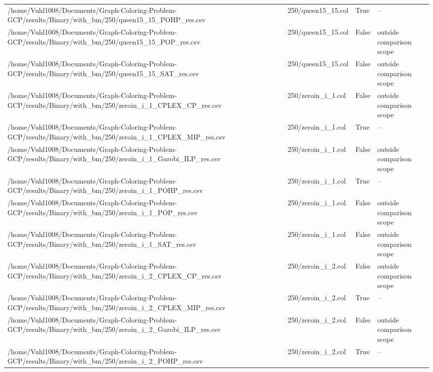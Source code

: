 \begin{table}[htbp]
\begin{tabular}{llll}
/home/Vuhl1008/Documents/Graph-Coloring-Problem-GCP/results/Binary/with\_bm/250/queen15\_15\_POHP\_res.csv & 250/queen15\_15.col & True & -- \\
/home/Vuhl1008/Documents/Graph-Coloring-Problem-GCP/results/Binary/with\_bm/250/queen15\_15\_POP\_res.csv & 250/queen15\_15.col & False & outside comparison scope \\
/home/Vuhl1008/Documents/Graph-Coloring-Problem-GCP/results/Binary/with\_bm/250/queen15\_15\_SAT\_res.csv & 250/queen15\_15.col & False & outside comparison scope \\
/home/Vuhl1008/Documents/Graph-Coloring-Problem-GCP/results/Binary/with\_bm/250/zeroin\_i\_1\_CPLEX\_CP\_res.csv & 250/zeroin\_i\_1.col & False & outside comparison scope \\
/home/Vuhl1008/Documents/Graph-Coloring-Problem-GCP/results/Binary/with\_bm/250/zeroin\_i\_1\_CPLEX\_MIP\_res.csv & 250/zeroin\_i\_1.col & True & -- \\
/home/Vuhl1008/Documents/Graph-Coloring-Problem-GCP/results/Binary/with\_bm/250/zeroin\_i\_1\_Gurobi\_ILP\_res.csv & 250/zeroin\_i\_1.col & False & outside comparison scope \\
/home/Vuhl1008/Documents/Graph-Coloring-Problem-GCP/results/Binary/with\_bm/250/zeroin\_i\_1\_POHP\_res.csv & 250/zeroin\_i\_1.col & True & -- \\
/home/Vuhl1008/Documents/Graph-Coloring-Problem-GCP/results/Binary/with\_bm/250/zeroin\_i\_1\_POP\_res.csv & 250/zeroin\_i\_1.col & False & outside comparison scope \\
/home/Vuhl1008/Documents/Graph-Coloring-Problem-GCP/results/Binary/with\_bm/250/zeroin\_i\_1\_SAT\_res.csv & 250/zeroin\_i\_1.col & False & outside comparison scope \\
/home/Vuhl1008/Documents/Graph-Coloring-Problem-GCP/results/Binary/with\_bm/250/zeroin\_i\_2\_CPLEX\_CP\_res.csv & 250/zeroin\_i\_2.col & False & outside comparison scope \\
/home/Vuhl1008/Documents/Graph-Coloring-Problem-GCP/results/Binary/with\_bm/250/zeroin\_i\_2\_CPLEX\_MIP\_res.csv & 250/zeroin\_i\_2.col & True & -- \\
/home/Vuhl1008/Documents/Graph-Coloring-Problem-GCP/results/Binary/with\_bm/250/zeroin\_i\_2\_Gurobi\_ILP\_res.csv & 250/zeroin\_i\_2.col & False & outside comparison scope \\
/home/Vuhl1008/Documents/Graph-Coloring-Problem-GCP/results/Binary/with\_bm/250/zeroin\_i\_2\_POHP\_res.csv & 250/zeroin\_i\_2.col & True & -- \\

\end{tabular}
\end{table}
